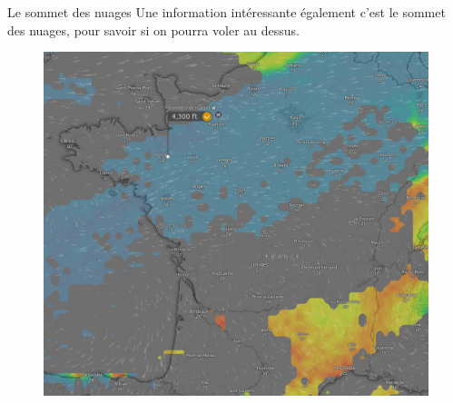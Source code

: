 \documentclass{beamer}
\begin{document}
\begin{frame}{Le sommet des nuages}
  Une information intéressante également c'est le sommet des nuages,
  pour savoir si on pourra voler au dessus.
  \begin{figure}
    \centering
    \includegraphics[scale=0.5]{images/windy-cloudtop.png}
  \end{figure}
\end{frame}
\end{document}
